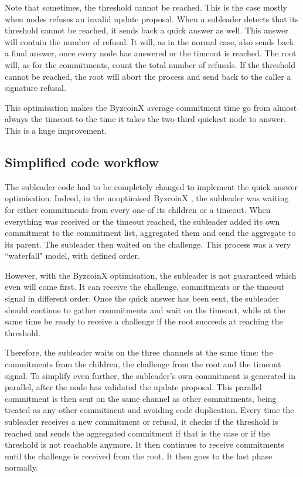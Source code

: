 \documentclass[11pt, a4paper, twoside, openright]{article}
\begin{document}
Note that sometimes, the threshold cannot be reached. This is the case mostly when nodes refuses an invalid update proposal. When a subleader detects that its threshold cannot be reached, it sends back a quick answer as well. This answer will contain the number of refusal. It will, as in the normal case, also sends back a final answer, once every node has answered or the timeout is reached. The root will, as for the commitments, count the total number of refusals. If the threshold cannot be reached, the root will abort the process and send back to the caller a signature refusal.

This optimisation makes the ByzcoinX average commitment time go from almost always the timeout to the time it takes the two-third quickest node to answer. This is a huge improvement.


\subsection{Simplified code workflow}
The subleader code had to be completely changed to implement the quick answer optimisation. Indeed, in the unoptimised ByzcoinX , the subleader was waiting for either commitments from every one of its children or a timeout. When everything was received or the timeout reached, the subleader added its own commitment to the commitment list, aggregated them and send the aggregate to its parent. The subleader then waited on the challenge. This process was a very ``waterfall" model, with defined order.

However, with the ByzcoinX optimisation, the subleader is not guaranteed which even will come first. It can receive the challenge, commitments or the timeout signal in different order. Once the quick answer has been sent, the subleader should continue to gather commitments and wait on the timeout, while at the same time be ready to receive a challenge if the root succeeds at reaching the threshold.

Therefore, the subleader waits on the three channels at the same time: the commitments from the children, the challenge from the root and the timeout signal. To simplify even further, the subleader's own commitment is generated in parallel, after the node has validated the update proposal. This parallel commitment is then sent on the same channel as other commitments, being treated as any other commitment and avoiding code duplication. Every time the subleader receives a new commitment or refusal, it checks if the threshold is reached and sends the aggregated commitment if that is the case or if the threshold is not reachable anymore. It then continues to receive commitments until the challenge is received from the root. It then goes to the last phase normally.
\end{document}
